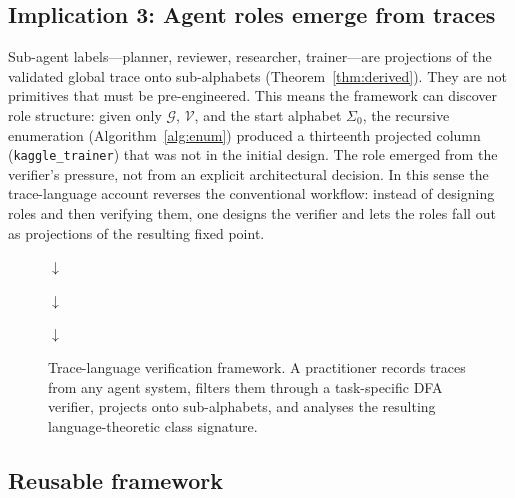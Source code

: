 \subsection{Implication 3: Agent roles emerge from traces}

Sub-agent labels---planner, reviewer, researcher, trainer---are
projections of the validated global trace onto sub-alphabets
(Theorem~\ref{thm:derived}).  They are not primitives that must be
pre-engineered.  This means the framework can discover role
structure: given only $\mathcal{G}$, $\mathcal{V}$, and the start
alphabet $\Sigma_0$, the recursive enumeration
(Algorithm~\ref{alg:enum}) produced a thirteenth projected column
(\texttt{kaggle\_trainer}) that was not in the initial design.
The role emerged from the verifier's pressure, not from an explicit
architectural decision.  In this sense the trace-language account
reverses the conventional workflow: instead of designing roles and
then verifying them, one designs the verifier and lets the roles
fall out as projections of the resulting fixed point.

\begin{figure}[ht]
\centering
\vspace{2pt}
\vspace{4pt}

\noindent\hfil$\downarrow$\hfil
\vspace{4pt}

\vspace{4pt}

\noindent\hfil$\downarrow$\hfil
\vspace{4pt}

\vspace{4pt}

\noindent\hfil$\downarrow$\hfil
\vspace{4pt}

\vspace{2pt}
\caption{Trace-language verification framework.  A practitioner
records traces from any agent system, filters them through a
task-specific DFA verifier, projects onto sub-alphabets, and
analyses the resulting language-theoretic class signature.}
\label{fig:framework}
\end{figure}

\subsection{Reusable framework}

